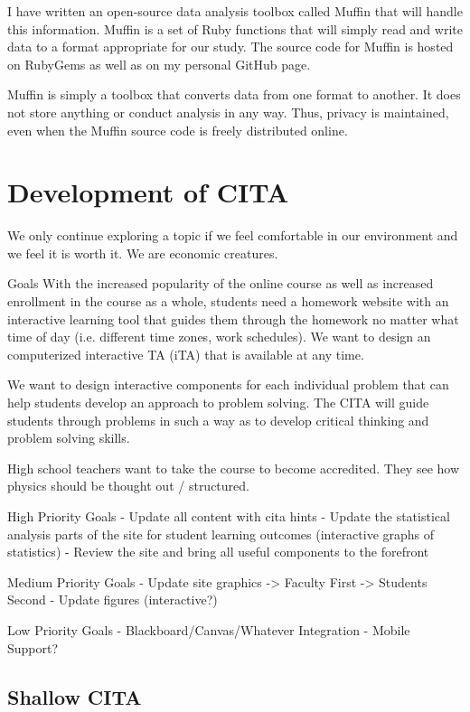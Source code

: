 I have written an open-source data analysis toolbox called Muffin that will handle this information. Muffin is a set of Ruby functions that will simply read and write data to a format appropriate for our study. The source code for Muffin is hosted on RubyGems as well as on my personal GitHub page.

Muffin is simply a toolbox that converts data from one format to another. It does not store anything or conduct analysis in any way. Thus, privacy is maintained, even when the Muffin source code is freely distributed online.

\section{Development of CITA}

We only continue exploring a topic if we feel comfortable in our environment and we feel it is worth it. We are economic creatures.

Goals
With the increased popularity of the online course as well as increased enrollment in the course as a whole, students need a homework website with an interactive learning tool that guides them through the homework no matter what time of day (i.e. different time zones, work schedules).  We want to design an computerized interactive TA (iTA) that is available at any time.

We want to design interactive components for each individual problem that can help students develop an approach to problem solving.  The CITA will guide students through problems in such a way as to develop critical thinking and problem solving skills.

High school teachers want to take the course to become accredited.  They see how physics should be thought out / structured.

High Priority Goals
- Update all content with \gls{cita} hints
- Update the statistical analysis parts of the site for student learning outcomes (interactive graphs of statistics)
- Review the site and bring all useful components to the forefront

Medium Priority Goals
- Update site graphics
-> Faculty First
-> Students Second
- Update figures (interactive?)

Low Priority Goals
- Blackboard/Canvas/Whatever Integration
- Mobile Support?

\subsection{Shallow CITA}

